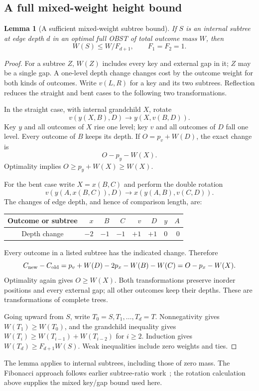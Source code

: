 \documentclass[11pt]{article}
\newtheorem{lemma}[theorem]{Lemma}
\begin{document}
\subsection{A full mixed-weight height bound}
\begin{lemma}[A sufficient mixed-weight subtree bound]\label{lem:mass}
If $S$ is an internal subtree at edge depth $d$ in an optimal full OBST
of total outcome mass $W$, then
\[
 W(S)\le W/F_{d+1},\qquad F_1=F_2=1.
\]
\end{lemma}
\begin{proof}
For a subtree $Z$, $W(Z)$ includes every key and external gap in it;
$Z$ may be a single gap. A one-level depth change changes cost by the
outcome weight for both kinds of outcomes. Write $v(L,R)$ for a key and
its two subtrees. Reflection reduces the straight and bent cases to the
following two transformations.

In the straight case, with internal grandchild $X$, rotate
\[
 v(y(X,B),D)\longrightarrow y(X,v(B,D)).
\]
Key $y$ and all outcomes of $X$ rise one level; key $v$ and all outcomes
of $D$ fall one level. Every outcome of $B$ keeps its depth. If
$O=p_v+W(D)$, the exact change is
\[
 O-p_y-W(X).
\]
Optimality implies $O\ge p_y+W(X)\ge W(X)$.

For the bent case write $X=x(B,C)$ and perform the double rotation
\[
 v(y(A,x(B,C)),D)\longrightarrow x(y(A,B),v(C,D)).
\]
The changes of edge depth, and hence of comparison length, are:
\begin{center}
\begin{tabular}{c|rrrrrrr}
Outcome or subtree & $x$ & $B$ & $C$ & $v$ & $D$ & $y$ & $A$\\
\hline
Depth change & $-2$ & $-1$ & $-1$ & $+1$ & $+1$ & $0$ & $0$
\end{tabular}
\end{center}
Every outcome in a listed subtree has the indicated change. Therefore
\[
 C_{\rm new}-C_{\rm old}
 =p_v+W(D)-2p_x-W(B)-W(C)
 =O-p_x-W(X).
\]
Optimality again gives $O\ge W(X)$. Both transformations preserve inorder
positions and every external gap; all other outcomes keep their depths.
These are transformations of complete trees.

Going upward from $S$, write $T_0=S,T_1,\ldots,T_d=T$. Nonnegativity
gives $W(T_1)\ge W(T_0)$, and the grandchild inequality gives
$W(T_i)\ge W(T_{i-1})+W(T_{i-2})$ for $i\ge2$.
Induction gives $W(T_d)\ge F_{d+1}W(S)$. Weak inequalities include
zero weights and ties.
\end{proof}
The lemma applies to internal subtrees, including those of zero mass.
The Fibonacci approach follows earlier subtree-ratio work~\cite{hlm};
the rotation calculation above supplies the mixed key/gap bound used here.
\end{document}

